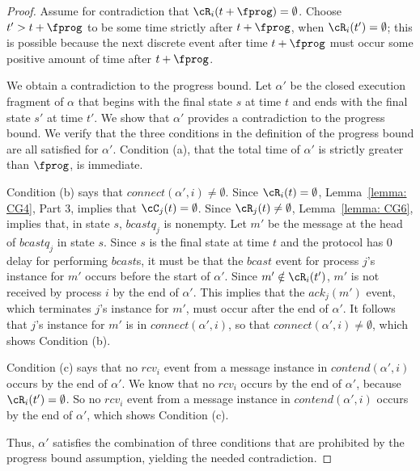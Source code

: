 \begin{proof}
Assume for contradiction that $\cR_i(t + \fprog) = \emptyset$.
Choose $t' > t + \fprog$ to be some time strictly after $t + \fprog$,
when $\cR_i(t') = \emptyset$;
this is possible because the next discrete event after time $t +
\fprog$ must occur some positive amount of time after $t + \fprog$.

We obtain a contradiction to the progress bound.
Let $\alpha'$ be the closed execution fragment of $\alpha$ that begins
with the final state $s$ at time $t$ and ends with the final state
$s'$ at time $t'$.
We show that $\alpha'$ provides a contradiction to the progress
bound.  We verify that the three conditions in the definition of the
progress bound are all satisfied for $\alpha'$.  Condition (a), that
the total time of $\alpha'$ is strictly greater than $\fprog$,
is immediate.

Condition (b) says that $connect(\alpha',i) \neq \emptyset$.
Since $\cR_i(t) = \emptyset$, Lemma~\ref{lemma: CG4}, Part 3, implies
that $\cC_j(t) = \emptyset$.
Since $\cR_j(t) \neq \emptyset$, Lemma~\ref{lemma: CG6},
implies
that, in state $s$, $bcastq_j$ is nonempty.
Let $m'$ be the message at the head of $bcastq_j$ in state $s$.
Since $s$ is the final state at time $t$ and the protocol has $0$
delay for performing $bcast$s, it must be that the $bcast$ event for
process $j$'s instance for $m'$ occurs before the start of $\alpha'$.
Since $m' \notin \cR_i(t')$, $m'$ is not received by process $i$ by the
end of $\alpha'$.
This implies that the $ack_j(m')$ event, which terminates $j$'s
instance for $m'$, must occur after the end of $\alpha'$.
It follows that $j$'s instance for $m'$ is in $connect(\alpha', i)$,
so that $connect(\alpha',i) \neq \emptyset$, which shows Condition
(b).

Condition (c) says that no $rcv_i$ event from a message instance in
$contend(\alpha',i)$ occurs by the end of $\alpha'$.
We know that no $rcv_i$ occurs by the end of $\alpha'$, because $\cR_i(t') = \emptyset$.
So no $rcv_i$ event from a message instance in $contend(\alpha',i)$
occurs by the end of $\alpha'$, which shows Condition (c).

Thus, $\alpha'$ satisfies the combination of three conditions that
are prohibited by the progress bound assumption, yielding the needed
contradiction.
\end{proof}




